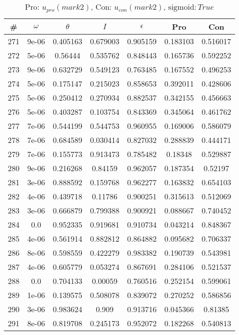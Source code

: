 \newpage
\begin{table}
\caption{Pro: $u_{pro} (mark 2)$, Con: $u_{con} (mark 2)$, $\mathrm{sigmoid}: True$}
\begin{tabular*}{\linewidth}{c|c|c|c|c|c|c}
\# & $\omega$ & $\theta$ & $I$ & $\epsilon$ & Pro & Con \\
\hline
271 & 9e-06 & 0.405163 & 0.679003 & 0.905159 & 0.183103 & 0.516017\\
272 & 5e-06 & 0.56444 & 0.535762 & 0.848443 & 0.165736 & 0.592252\\
273 & 9e-06 & 0.632729 & 0.549123 & 0.763485 & 0.167552 & 0.496253\\
274 & 5e-06 & 0.175147 & 0.215023 & 0.858653 & 0.392011 & 0.428606\\
275 & 5e-06 & 0.250412 & 0.270934 & 0.882537 & 0.342155 & 0.456663\\
276 & 5e-06 & 0.403287 & 0.103754 & 0.843369 & 0.345064 & 0.461762\\
277 & 7e-06 & 0.544199 & 0.544753 & 0.960955 & 0.169006 & 0.586079\\
278 & 7e-06 & 0.684589 & 0.030414 & 0.827032 & 0.288839 & 0.444171\\
279 & 7e-06 & 0.155773 & 0.913473 & 0.785482 & 0.18348 & 0.529887\\
280 & 9e-06 & 0.216268 & 0.84159 & 0.962057 & 0.187354 & 0.52197\\
281 & 3e-06 & 0.888592 & 0.159768 & 0.962277 & 0.163832 & 0.654103\\
282 & 4e-06 & 0.439718 & 0.11786 & 0.900251 & 0.315613 & 0.512069\\
283 & 3e-06 & 0.666879 & 0.799388 & 0.900921 & 0.088667 & 0.740452\\
284 & 0.0 & 0.952335 & 0.919681 & 0.910734 & 0.043214 & 0.848367\\
285 & 4e-06 & 0.561914 & 0.882812 & 0.864882 & 0.095682 & 0.706337\\
286 & 8e-06 & 0.598559 & 0.422279 & 0.983382 & 0.190739 & 0.543981\\
287 & 4e-06 & 0.605779 & 0.053274 & 0.867691 & 0.284106 & 0.521537\\
288 & 0.0 & 0.704133 & 0.00059 & 0.760516 & 0.252154 & 0.599061\\
289 & 1e-06 & 0.139575 & 0.508078 & 0.839072 & 0.270252 & 0.586856\\
290 & 3e-06 & 0.983624 & 0.909 & 0.913716 & 0.045366 & 0.81385\\
291 & 8e-06 & 0.819708 & 0.245173 & 0.952072 & 0.182268 & 0.540813\\

\end{tabular*}
\end{table}
